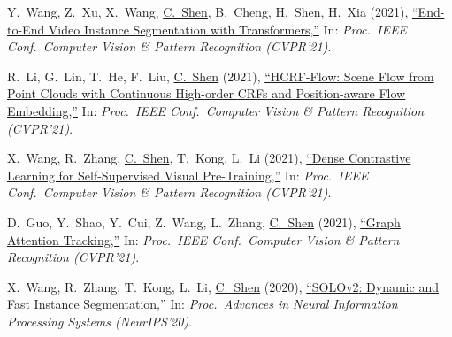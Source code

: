 \documentclass[9pt, a4paper]{article}
\newcommand{\years}[1]{\marginnote{\scriptsize #1}}
\def\highlight{\uline}
\begin{document}
\medskip

\years{2021} Y.~Wang, Z.~Xu, X.~Wang, \highlight{C.~Shen}, B.~Cheng, H.~Shen, H.~Xia (2021),
\href{http://www.google.com/search?lr=&ie=UTF-8&oe=UTF-8&q=End-to-End+Video+Instance+Segmentation+with+Transformers+Yuqing+Wang%2C+Zhaoliang+Xu%2C+Xinlong+Wang%2C+Chunhua+Shen%2C+Baoshan+Cheng%2C+Hao+Shen%2C+Huaxia+Xia}{``End-to-End Video Instance Segmentation with {T}ransformers,{}''}
In: \emph{Proc.\ IEEE Conf.\  Computer Vision \& Pattern Recognition (CVPR'21)}.

\medskip

\years{2021} R.~Li, G.~Lin, T.~He, F.~Liu, \highlight{C.~Shen} (2021),
\href{http://www.google.com/search?lr=&ie=UTF-8&oe=UTF-8&q=HCRF-Flow%3A+Scene+Flow+from+Point+Clouds+with+Continuous+High-order+CRFs+and+Position-aware+Flow+Embedding+Ruibo+Li%2C+Guosheng+Lin%2C+Tong+He%2C+Fayao+Liu%2C+Chunhua+Shen}{``{HCRF-Flow}: Scene Flow from Point Clouds with Continuous High-order {CRFs} and Position-aware Flow Embedding,{}''}
In: \emph{Proc.\ IEEE Conf.\  Computer Vision \& Pattern Recognition (CVPR'21)}.

\medskip

\years{2021} X.~Wang, R.~Zhang, \highlight{C.~Shen}, T.~Kong, L.~Li (2021),
\href{http://www.google.com/search?lr=&ie=UTF-8&oe=UTF-8&q=Dense+Contrastive+Learning+for+Self-Supervised+Visual+Pre-Training+Xinlong+Wang%2C+Rufeng+Zhang%2C+Chunhua+Shen%2C+Tao+Kong%2C+Lei+Li}{``Dense Contrastive Learning for Self-Supervised Visual Pre-Training,{}''}
In: \emph{Proc.\ IEEE Conf.\  Computer Vision \& Pattern Recognition (CVPR'21)}.

\medskip

\years{2021} D.~Guo, Y.~Shao, Y.~Cui, Z.~Wang, L.~Zhang, \highlight{C.~Shen} (2021),
\href{http://www.google.com/search?lr=&ie=UTF-8&oe=UTF-8&q=Graph+Attention+Tracking+Dongyan+Guo%2C+Yanyan+Shao%2C+Ying+Cui%2C+Zhenhua+Wang%2C+Liyan+Zhang%2C+Chunhua+Shen}{``Graph Attention Tracking,{}''}
In: \emph{Proc.\ IEEE Conf.\  Computer Vision \& Pattern Recognition (CVPR'21)}.

\medskip

\years{2020} X.~Wang, R.~Zhang, T.~Kong, L.~Li, \highlight{C.~Shen} (2020),
\href{http://www.google.com/search?lr=&ie=UTF-8&oe=UTF-8&q=SOLOv2%3A+Dynamic+and+Fast+Instance+Segmentation+Xinlong+Wang%2C+Rufeng+Zhang%2C+Tao+Kong%2C+Lei+Li%2C+Chunhua+Shen}{``{SOLOv2}: Dynamic and Fast Instance Segmentation,{}''}
In: \emph{Proc.\ Advances in Neural Information Processing Systems (NeurIPS'20)}.
\end{document}
